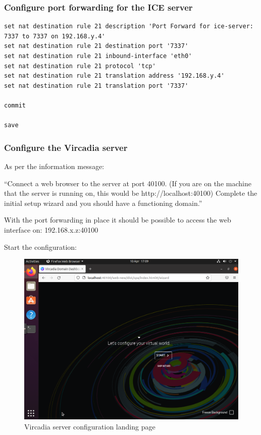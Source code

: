 \hypertarget{configure-port-forwarding-for-the-ice-server}{%
\subsubsection{Configure port forwarding for the ICE
server}\label{configure-port-forwarding-for-the-ice-server}}

\begin{verbatim}
set nat destination rule 21 description 'Port Forward for ice-server: 7337 to 7337 on 192.168.y.4'
set nat destination rule 21 destination port '7337'
set nat destination rule 21 inbound-interface 'eth0'
set nat destination rule 21 protocol 'tcp'
set nat destination rule 21 translation address '192.168.y.4'
set nat destination rule 21 translation port '7337'

commit

save
\end{verbatim}

\hypertarget{configure-the-vircadia-server}{%
\subsubsection{Configure the Vircadia
server}\label{configure-the-vircadia-server}}

As per the information message:

``Connect a web browser to the server at port 40100. (If you are on the
machine that the server is running on, this would be
http://localhost:40100) Complete the initial setup wizard and you should
have a functioning domain.''

With the port forwarding in place it should be possible to access the
web interface on: 192.168.x.z:40100

Start the configuration:

\begin{figure}
\centering
\includegraphics{Vircadia1.png}
\caption{Vircadia server configuration landing page}
\end{figure}

